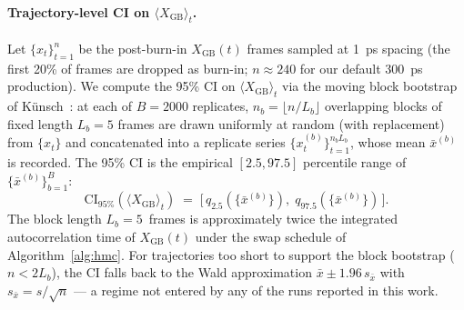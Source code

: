 \paragraph*{Trajectory-level CI on $\langle X_\mathrm{GB}\rangle_t$.}
Let $\{x_t\}_{t=1}^{n}$ be the post-burn-in $X_\mathrm{GB}(t)$ frames
sampled at 1~ps spacing (the first 20\% of frames are dropped as
burn-in; $n \approx 240$ for our default 300~ps production). We
compute the 95\% CI on $\langle X_\mathrm{GB}\rangle_t$ via the moving
block bootstrap of K\"unsch~\cite{Kunsch1989}: at each of $B = 2000$
replicates, $n_b = \lfloor n / L_b \rfloor$ overlapping blocks of fixed
length $L_b = 5$ frames are drawn uniformly at random (with
replacement) from $\{x_t\}$ and concatenated into a replicate series
$\{x_t^{(b)}\}_{t=1}^{n_b L_b}$, whose mean $\bar x^{(b)}$ is recorded.
The 95\% CI is the empirical $[2.5, 97.5]$ percentile range of
$\{\bar x^{(b)}\}_{b=1}^{B}$:
\begin{equation}\label{eq:block_bootstrap}
\mathrm{CI}_{95\%}\!\left(\langle X_\mathrm{GB}\rangle_t\right)
\;=\; \Big[\, q_{2.5}\!\left(\{\bar x^{(b)}\}\right), \;
              q_{97.5}\!\left(\{\bar x^{(b)}\}\right) \,\Big].
\end{equation}
The block length $L_b = 5$~frames is approximately twice the
integrated autocorrelation time of $X_\mathrm{GB}(t)$ under the swap
schedule of Algorithm~\ref{alg:hmc}. For trajectories too short to
support the block bootstrap ($n < 2 L_b$), the CI falls back to the
Wald approximation $\bar x \pm 1.96 \, s_{\bar x}$ with
$s_{\bar x} = s/\sqrt{n}$ — a regime not entered by any of the
runs reported in this work.



